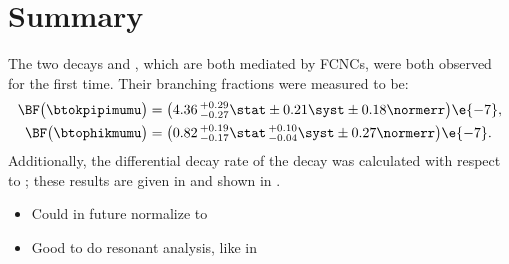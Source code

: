 \section{Summary}
\label{sec:hhh:conc}

The two decays \btokpipimumu and \btophikmumu, which are both mediated by FCNCs, were both observed
for the first time.
Their branching fractions were measured to be:
\begin{align*}
  \BF\big( \btokpipimumu \big)&=
  \big(4.36\,^{+0.29}_{-0.27}\stat\pm0.21\syst\pm0.18\normerr\big)\e{-7}, \\
  \BF\big(\btophikmumu\big)&=
  \big(0.82\,^{+0.19}_{-0.17}\stat\,^{+0.10}_{-0.04}\syst\pm0.27\normerr\big)\e{-7}.
\end{align*}
Additionally, the differential decay rate of the decay \btokpipimumu was calculated with respect to
\qsq; these results are given in  and shown in .

\begin{itemize}
  \item Could in future normalize to \decay{\Bp}{\jpsi\Kstar}
  \item Good to do resonant analysis, like in \decay{\Bp}{\kpipi\gamma}
\end{itemize}


